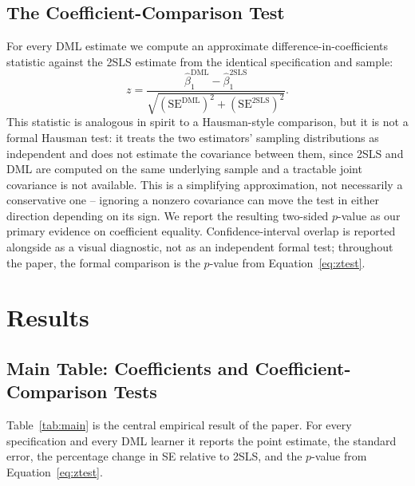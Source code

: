 \documentclass[10pt,twocolumn]{article}
\begin{document}
\subsection{The Coefficient-Comparison Test}
For every DML estimate we compute an approximate difference-in-coefficients
statistic against the 2SLS estimate from the identical specification and
sample:
\begin{equation}
z = \frac{\hat\beta_1^{\text{DML}} - \hat\beta_1^{\text{2SLS}}}
{\sqrt{\left(\text{SE}^{\text{DML}}\right)^2 + \left(\text{SE}^{\text{2SLS}}\right)^2}}.
\label{eq:ztest}
\end{equation}
This statistic is analogous in spirit to a Hausman-style comparison,
but it is not a formal Hausman test: it treats the two estimators'
sampling distributions as independent and does not estimate the
covariance between them, since 2SLS and DML are computed on the same
underlying sample and a tractable joint covariance is not available.
This is a simplifying approximation, not necessarily a conservative
one -- ignoring a nonzero covariance can move the test in either
direction depending on its sign. We report the resulting two-sided
$p$-value as our primary evidence on coefficient equality.
Confidence-interval overlap is reported alongside as a visual
diagnostic, not as an independent formal test; throughout the paper,
the formal comparison is the $p$-value from Equation~\ref{eq:ztest}.

\section{Results}

\subsection{Main Table: Coefficients and Coefficient-Comparison Tests}
Table~\ref{tab:main} is the central empirical result of the paper. For
every specification and every DML learner it reports the point
estimate, the standard error, the percentage change in SE relative to
2SLS, and the $p$-value from Equation~\ref{eq:ztest}.
\end{document}
